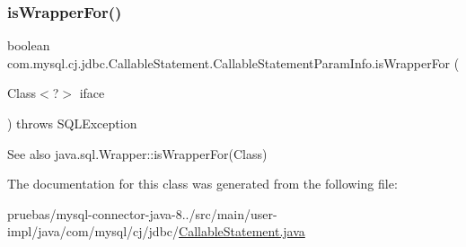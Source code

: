 \subsubsection{\texorpdfstring{is\+Wrapper\+For()}{isWrapperFor()}}
{\footnotesize\ttfamily boolean com.\+mysql.\+cj.\+jdbc.\+Callable\+Statement.\+Callable\+Statement\+Param\+Info.\+is\+Wrapper\+For (\begin{DoxyParamCaption}\item[{Class$<$?$>$}]{iface }\end{DoxyParamCaption}) throws S\+Q\+L\+Exception}

\begin{DoxySeeAlso}{See also}
java.\+sql.\+Wrapper\+::is\+Wrapper\+For(\+Class) 
\end{DoxySeeAlso}


The documentation for this class was generated from the following file\+:\begin{DoxyCompactItemize}
\item 
pruebas/mysql-\/connector-\/java-\/8../src/main/user-\/impl/java/com/mysql/cj/jdbc/\mbox{\hyperlink{_callable_statement_8java}{Callable\+Statement.\+java}}\end{DoxyCompactItemize}
